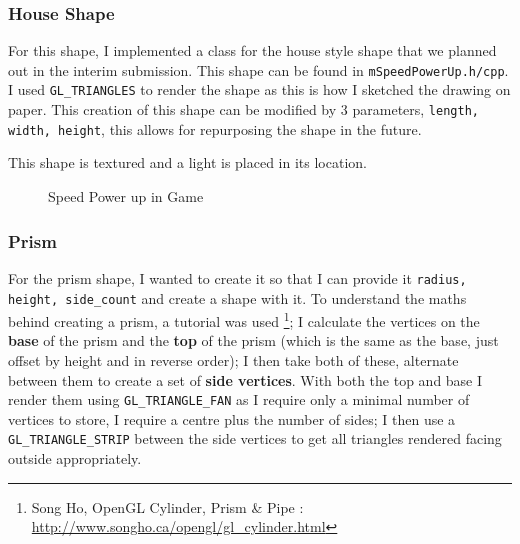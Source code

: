 \documentclass[11pt]{report}
\begin{document}
\subsubsection*{House Shape}
For this shape, I implemented a class for the house style shape that we planned out in the interim submission. This shape can be found in \colorbox{mygrey}{\lstinline{mSpeedPowerUp.h/cpp}}. I used \colorbox{mygrey}{\lstinline{GL_TRIANGLES}} to render the shape as this is how I sketched the drawing on paper. This creation of this shape can be modified by 3 parameters, \lstinline{length, width, height}, this allows for repurposing the shape in the future.

This shape is textured and a light is placed in its location.
\begin{figure}[H]
    \centering
    \caption{Speed Power up in Game}
\end{figure}

\subsubsection*{Prism}
For the prism shape, I wanted to create it so that I can provide it \lstinline{radius, height, side_count} and create a shape with it. To understand the maths behind creating a prism, a tutorial was used \footnote{Song Ho, OpenGL Cylinder, Prism \& Pipe : \url{http://www.songho.ca/opengl/gl_cylinder.html}}; I calculate the vertices on the \textbf{base} of the prism and the \textbf{top} of the prism (which is the same as the base, just offset by height and in reverse order); I then take both of these, alternate between them to create a set of \textbf{side vertices}. With both the top and base I render them using \lstinline{GL_TRIANGLE_FAN} as I require only a minimal number of vertices to store, I require a centre plus the number of sides; I then use a \lstinline{GL_TRIANGLE_STRIP} between the side vertices to get all triangles rendered facing outside appropriately.
\end{document}
